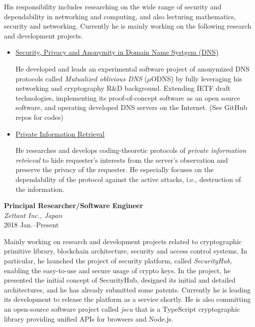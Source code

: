 \hspace*{4ex} His responsibility includes researching on the wide range of security and dependability in networking and computing, and also lecturing mathematics, security and networking.
Currently he is mainly working on the following research and development projects.
\begin{itemize}
\item \hspace*{4ex} \underline{Security, Privacy and Anonymity in Domain Name Systgem (DNS)}\\[0.5ex]
\hspace*{6ex}\begin{minipage}{0.9\linewidth}
He developed and leads an experimental software project of anonymized DNS protocols called \textit{Mutualized oblivious DNS} ($\mu$ODNS) by fully leveraging his networking and cryptography R\&D background. Extending IETF draft technologies, implementing its proof-of-concept software as an open source software, and operating developed DNS servers on the Internet. (See GitHub repos for codes)
\end{minipage}
\item \hspace*{4ex} \underline{Private Information Retrieval}\\[0.5ex]
\hspace*{6ex}\begin{minipage}{0.9\linewidth}
He researches and develops coding-theoretic protocols of \emph{private information retrieval} to hide requester's interests from the server's observation and preserve the privacy of the requester. He especially focuses on the dependability of the protocol against the active attacks, i.e., destruction of the information.
\end{minipage}
\end{itemize}
\vspace*{2ex}

\textbf{Principal Researcher/Software Engineer}\\
\hspace*{4ex}\textit{Zettant Inc., Japan}\\
\hspace*{4ex}2018 Jan.--Present

\hspace*{4ex} Mainly working on research and development projects related to cryptographic primitive library, blockchain architecture, security and access control systems. In particular, he launched the project of security platform, called \emph{SecurityHub}, enabling the easy-to-use and secure usage of crypto keys. In the project, he presented the initial concept of SecurityHub, designed its initial and detailed architectures, and he has already submitted some patents. Currently he is leading its development to release the platform as a service shortly.
He is also committing an open-source software project called \emph{jscu} that is a TypeScript cryptographic library providing unified APIs for browsers and Node.js.
\vspace*{2ex}


